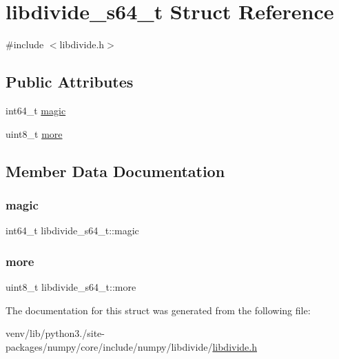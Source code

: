\hypertarget{structlibdivide__s64__t}{}\section{libdivide\+\_\+s64\+\_\+t Struct Reference}
\label{structlibdivide__s64__t}


{\ttfamily \#include $<$libdivide.\+h$>$}

\subsection*{Public Attributes}
\begin{DoxyCompactItemize}
\item 
int64\+\_\+t \hyperlink{structlibdivide__s64__t_afd30f65696401254775387f3f842b5b8}{magic}
\item 
uint8\+\_\+t \hyperlink{structlibdivide__s64__t_a4d9acecbd922a8da45c66aa83c7bf857}{more}
\end{DoxyCompactItemize}


\subsection{Member Data Documentation}
\mbox{\label{structlibdivide__s64__t_afd30f65696401254775387f3f842b5b8}} 
\subsubsection{\texorpdfstring{magic}{magic}}
{\footnotesize\ttfamily int64\+\_\+t libdivide\+\_\+s64\+\_\+t\+::magic}

\mbox{\label{structlibdivide__s64__t_a4d9acecbd922a8da45c66aa83c7bf857}} 
\subsubsection{\texorpdfstring{more}{more}}
{\footnotesize\ttfamily uint8\+\_\+t libdivide\+\_\+s64\+\_\+t\+::more}



The documentation for this struct was generated from the following file\+:\begin{DoxyCompactItemize}
\item 
venv/lib/python3./site-\/packages/numpy/core/include/numpy/libdivide/\hyperlink{libdivide_8h}{libdivide.\+h}\end{DoxyCompactItemize}
